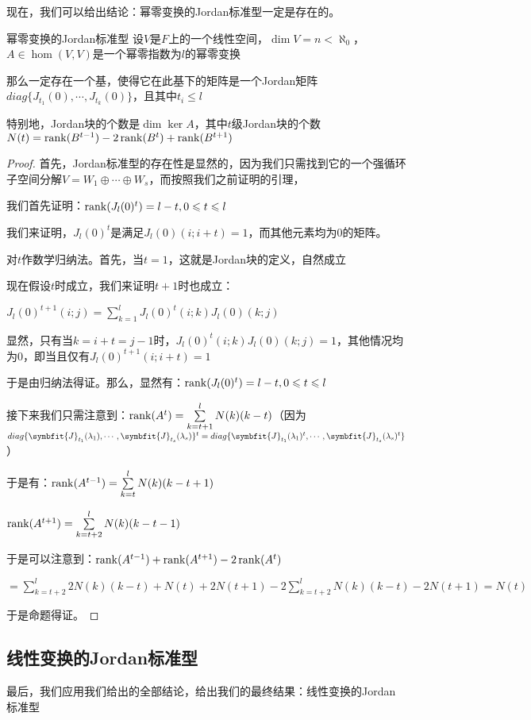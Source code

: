 \documentclass[12pt, a4paper, oneside, UTF8]{ctexbook}
\begin{document}
			现在，我们可以给出结论：幂零变换的Jordan标准型一定是存在的。
			\begin{them}{幂零变换的Jordan标准型}{}
				设$V$是$F$上的一个线性空间，$\dim V = n < \aleph_0$，$A \in \hom(V,V)$是一个幂零指数为$l$的幂零变换

				那么一定存在一个基，使得它在此基下的矩阵是一个Jordan矩阵$diag\{J_{t_1}(0),\cdots,J_{t_k}(0)\}$，且其中$t_i \leqslant l$

				特别地，Jordan块的个数是$\dim \ker A$，其中$t$级Jordan块的个数$N(t)=\operatorname{rank}(B^{t-1})-2\operatorname{rank}(B^t)+\operatorname{rank}(B^{t+1})$
			\end{them}
			\begin{proof}
				首先，Jordan标准型的存在性是显然的，因为我们只需找到它的一个强循环子空间分解$V=W_1 \oplus \cdots \oplus W_s$，而按照我们之前证明的引理，

				我们首先证明：$\operatorname{rank}(J_l(0)^{t})=l-t,0 \leqslant t \leqslant l$

				我们来证明，$J_l(0)^t$是满足$J_l(0)(i;i+t)=1$，而其他元素均为$0$的矩阵。

				对$t$作数学归纳法。首先，当$t=1$，这就是Jordan块的定义，自然成立

				现在假设$t$时成立，我们来证明$t+1$时也成立：

				$J_{l}(0)^{t+1}(i;j)=\sum\limits_{k=1}^{l}J_l(0)^t(i;k)J_l(0)(k;j)$

				显然，只有当$k=i+t=j-1$时，$J_l(0)^t(i;k)J_l(0)(k;j)=1$，其他情况均为$0$，即当且仅有$J_{l}(0)^{t+1}(i;i+t)=1$

				于是由归纳法得证。那么，显然有：$\operatorname{rank}(J_l(0)^t)=l-t,0 \leqslant t \leqslant l$

				接下来我们只需注意到：$\operatorname{rank}(A^t)=\sum\limits_{k=t+1}^{l} N(k)(k-t)$（因为$diag\{\symbfit{J}_{t_1}(\lambda_1),\cdots,\symbfit{J}_{t_s}(\lambda_s)\}^{t}=diag\{\symbfit{J}_{t_1}(\lambda_1)^t,\cdots,\symbfit{J}_{t_s}(\lambda_s)^t\}$）

				于是有：$\operatorname{rank}(A^{t-1})=\sum\limits_{k=t}^{l} N(k)(k-t+1)$

				$\operatorname{rank}(A^{t+1})=\sum\limits_{k=t+2}^{l} N(k)(k-t-1)$

				于是可以注意到：$\operatorname{rank}(A^{t-1})+\operatorname{rank}(A^{t+1})-2\operatorname{rank}(A^t)$

				$=\sum\limits_{k=t+2}^{l} 2N(k)(k-t)+N(t)+2N(t+1)-2\sum\limits_{k=t+2}^{l}N(k)(k-t)-2N(t+1)=N(t)$

				于是命题得证。
			\end{proof}
		\subsection{线性变换的Jordan标准型}
			最后，我们应用我们给出的全部结论，给出我们的最终结果：线性变换的Jordan标准型
\end{document}
